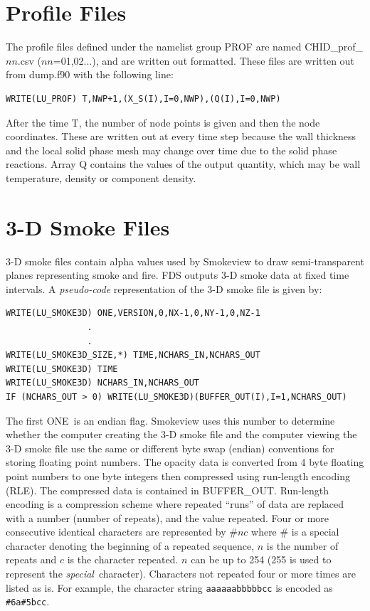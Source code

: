 \documentclass[11pt]{book}
\begin{document}
\section{Profile Files}
\label{out:PROF}

The profile files defined under the namelist group {\ct PROF} are named {\ct CHID\_prof\_$nn$.csv} ($nn$=01,02...), and are written out formatted. These files are written out from {\ct dump.f90} with the following line:
\begin{lstlisting}
WRITE(LU_PROF) T,NWP+1,(X_S(I),I=0,NWP),(Q(I),I=0,NWP)
\end{lstlisting}
After the time {\ct T}, the number of node points is given and then the node coordinates. These are written out at every time step because the wall thickness and the local solid phase mesh may change over time due to the solid phase reactions. Array {\ct Q} contains the values of the output quantity, which may be wall temperature, density or component density.

\section{3-D Smoke Files}
\label{out:SMOKE3D}

3-D smoke files contain alpha values used by Smokeview to draw semi-transparent planes representing smoke and fire. FDS outputs 3-D smoke data at fixed time intervals.  A {\em pseudo-code} representation of the 3-D smoke file is given by:
\begin{lstlisting}
WRITE(LU_SMOKE3D) ONE,VERSION,0,NX-1,0,NY-1,0,NZ-1
                .
                .
WRITE(LU_SMOKE3D_SIZE,*) TIME,NCHARS_IN,NCHARS_OUT
WRITE(LU_SMOKE3D) TIME
WRITE(LU_SMOKE3D) NCHARS_IN,NCHARS_OUT
IF (NCHARS_OUT > 0) WRITE(LU_SMOKE3D)(BUFFER_OUT(I),I=1,NCHARS_OUT)
\end{lstlisting}
The first {\ct ONE}\ is an endian flag.  Smokeview uses this number to determine whether the computer creating the 3-D smoke file and the computer viewing the 3-D smoke file use the same or different byte swap (endian) conventions for storing floating point numbers.  The opacity data is converted from 4 byte floating point numbers to one byte integers then compressed using run-length encoding (RLE). The compressed data is contained in {\ct BUFFER\_OUT}.  Run-length encoding is a compression scheme where repeated ``runs'' of data are replaced with a number (number of repeats), and the value repeated. Four or more consecutive identical characters are represented by $\# n c$ where $\#$ is a special character denoting the beginning of a repeated sequence, $n$ is the number of repeats and $c$ is the character repeated.  $n$ can be up to 254 (255 is used to represent the {\em special}\ character). Characters not repeated four or more times are listed as is. For example, the character string {\tt aaaaaabbbbbcc} is encoded as {\tt \#6a\#5bcc}.
\end{document}
